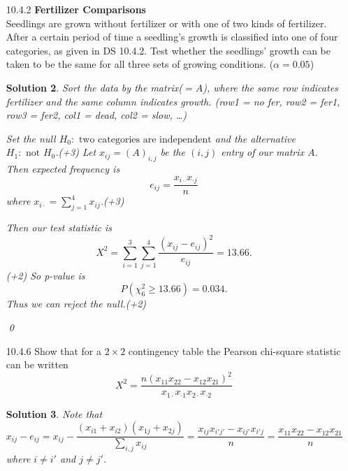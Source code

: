 \documentclass[a4paper,10pt]{article}
\newtheorem*{sol}{Solution}
\begin{document}
\begin{itemize}
\begin{sol}
	The total number of participants is $100$.
	Let $(x_1, x_2, x_3) = (22, 38, 40)$.
	Set the null $H_0: p_i = 1/3$ and the alternative $H_1: \text{ not }H_0$.(+3)
	Then the expected frequency is $100/3 = e_i$ each.(+3)
	Our test statistic is
	\[
		\sum_{i=1}^3 \frac{\left( x_i - e_i \right)^2}{e_i} = 5.84.
	\](+2)
	So, p-value is
	\[
		P(\chi^2_2 \ge 5.84) = 0.054,
	\]
	thus we cannot reject the null under $\alpha = 0.05$.(+2)
	(False: the survey does not provide sufficient evidence.)
	
	\qed
\end{sol}
\begin{align*}
	\text{A. } \text{True} && \text{B .} \text{False} && &&
\end{align*}
\item [10.4.2]\textbf{Fertilizer Comparisons}\\
Seedlings are grown without fertilizer or with one of two
kinds of fertilizer. After a certain period of time a
seedling’s growth is classified into one of four
categories, as given in DS 10.4.2. Test whether the
seedlings’ growth can be taken to be the same for all
three sets of growing conditions. ($\alpha=0.05$)

\begin{sol}
	Sort the data by the matrix($ = A$), where the same row indicates fertilizer and the same column indicates growth.
	(row1 = no fer, row2 = fer1, row3 = fer2, col1 = dead, col2 = slow, \dots)

	Set the null $H_0: \text{ two categories are independent}$ and the alternative $H_1: \text{ not }H_0$.(+3)
	Let $x_{ij} = (A)_{i, j}$ be the $(i, j)$ entry of our matrix $A$.
	Then expected frequency is
	\[
		e_{ij} = \frac{x_{i \cdot}x_{\cdot j}}{n}
	\]
	where $x_{i\cdot} = \sum_{j=1}^4 x_{ij}$.(+3)
	
	Then our test statistic is
	\[
		X^2 = \sum_{i=1}^3 \sum_{j=1}^4 \frac{(x_{ij} - e_{ij})^2}{e_{ij}} = 13.66.
	\](+2)
	So p-value is
	\[
		P(\chi^2_6 \ge 13.66) = 0.034.
	\]
	Thus we can reject the null.(+2)
	
	\qed
\end{sol}
\item [10.4.6] Show that for a $2\times 2$ contingency table the Pearson
chi-square statistic can be written
$$
X^{2}=\frac{n(x_{11}x_{22}-x_{12}x_{21})^{2}}{x_{1\cdot}x_{\cdot 1}x_{2\cdot}x_{\cdot 2}}
$$

\begin{sol}	
	Note that
	\[
		x_{ij} - e_{ij} = x_{ij} - \frac{(x_{i1} + x_{i2})(x_{1j} + x_{2j})}{\sum_{i, j}x_{ij}}
		= \frac{x_{ij}x_{i'j'} - x_{ij'}x_{i'j}}{n}
		= \frac{x_{11}x_{22} - x_{12}x_{21}}{n}
	\]
	where $i \ne i'$ and $j \ne j'$.


\end{sol}
\end{itemize}
\end{document}
